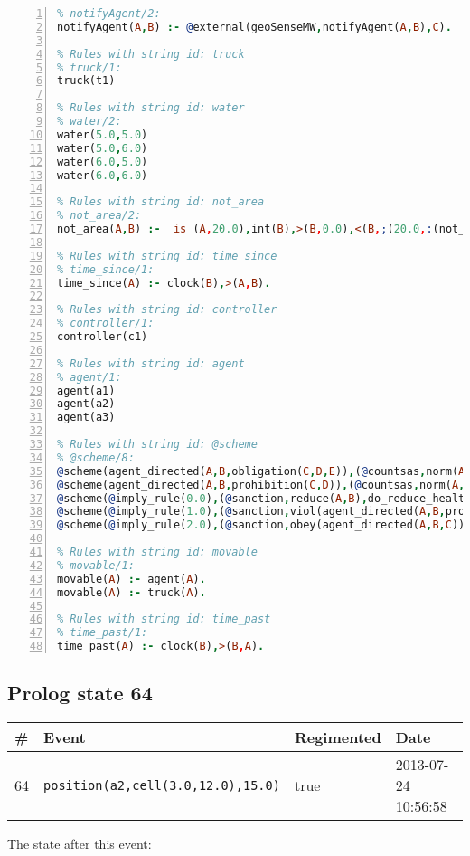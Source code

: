 \documentclass[11pt]{article}\usepackage[utf8]{inputenc}\usepackage{geometry}
\begin{document}
\begin{lstlisting}[language=Prolog, numbers=left]
% Rules with string id: notifyAgent
% notifyAgent/2:
notifyAgent(A,B) :- @external(geoSenseMW,notifyAgent(A,B),C).

% Rules with string id: truck
% truck/1:
truck(t1)

% Rules with string id: water
% water/2:
water(5.0,5.0)
water(5.0,6.0)
water(6.0,5.0)
water(6.0,6.0)

% Rules with string id: not_area
% not_area/2:
not_area(A,B) :-  is (A,20.0),int(B),>(B,0.0),<(B,;(20.0,:(not_area(A,B), is (-(B),20.0)))),int(A),>(A,0.0),<(A,;(20.0,:(area(A,B),-(int(A))))),int(B),>(A,0.0),>(B,0.0),<(A,21.0),<(B,21.0).

% Rules with string id: time_since
% time_since/1:
time_since(A) :- clock(B),>(A,B).

% Rules with string id: controller
% controller/1:
controller(c1)

% Rules with string id: agent
% agent/1:
agent(a1)
agent(a2)
agent(a3)

% Rules with string id: @scheme
% @scheme/8:
@scheme(agent_directed(A,B,obligation(C,D,E)),(@countsas,norm(A,B,F,obligation(C,D,E)),F),false,(listTrue(C)),(time_past(D)),false,[plus(viol(agent_directed(A,B,obligation(C,D,E))))|[]],[plus(obey(agent_directed(A,B,obligation(C,D,E))))|[]])
@scheme(agent_directed(A,B,prohibition(C,D)),(@countsas,norm(A,B,E,prohibition(C,D)),E),(listTrue(C)),false,(false),false,[plus(viol(agent_directed(A,B,prohibition(C,D))))|[]],[plus(obey(agent_directed(A,B,prohibition(C,D))))|[]])
@scheme(@imply_rule(0.0),(@sanction,reduce(A,B),do_reduce_health(A,B),notifyAgent(A,changed(status))),true,false,false,false,[min(reduce(A,B))|[]],[])
@scheme(@imply_rule(1.0),(@sanction,viol(agent_directed(A,B,prohibition(C,D))),do_sanction(D)),true,false,false,false,[min(viol(agent_directed(A,B,prohibition(C,D))))|[]],[])
@scheme(@imply_rule(2.0),(@sanction,obey(agent_directed(A,B,C))),true,false,false,false,[min(obey(agent_directed(A,B,C)))|[]],[])

% Rules with string id: movable
% movable/1:
movable(A) :- agent(A).
movable(A) :- truck(A).

% Rules with string id: time_past
% time_past/1:
time_past(A) :- clock(B),>(B,A).

\end{lstlisting}
\clearpage 
\subsection{Prolog state 64}
\begin{table}[ht]
\centering 
\begin{tabular}{l l l l} 
\textbf{\#} & \textbf{Event} & \textbf{Regimented} & \textbf{Date} \\ [0.5ex] 
\hline
64&\texttt{position(a2,cell(3.0,12.0),15.0)}&true&2013-07-24 10:56:58\\ [1ex] \hline\end{tabular}
\end{table}
The state after this event:
\end{document}

